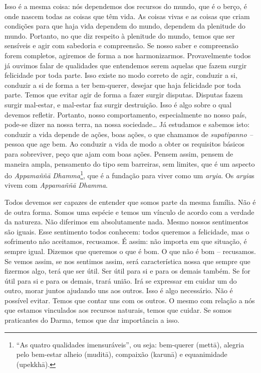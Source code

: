 Isso é a mesma coisa: nós dependemos dos recursos do mundo, que é o
berço, é onde nascem todas as coisas que têm vida. As coisas vivas e as
coisas que criam condições para que haja vida dependem do mundo,
dependem da plenitude do mundo. Portanto, no que diz respeito à
plenitude do mundo, temos que ser sensíveis e agir com sabedoria e
compreensão. Se nosso saber e compreensão forem completos, agiremos de
forma a nos harmonizarmos. Provavelmente todos já ouvimos falar de
qualidades que entendemos serem aquelas que fazem surgir felicidade por
toda parte. Isso existe no modo correto de agir, conduzir a si,
conduzir a si de forma a ter bem-querer, desejar que haja felicidade
por toda parte. Temos que evitar agir de forma a fazer surgir disputas.
Disputas fazem surgir mal-estar, e mal-estar faz surgir destruição.
Isso é algo sobre o qual devemos refletir. Portanto, nosso
comportamento, especialmente no nosso país, pode-se dizer na nossa
terra, na nossa sociedade… Já estudamos e sabemos isto: conduzir a vida
depende de ações, boas ações, o que chamamos de \textit{supatipanno –
}pessoa que age bem. Ao conduzir a vida de modo a obter os requisitos
básicos para sobreviver, peço que ajam com boas ações. Pensem assim,
pensem de maneira ampla, pensamento do tipo sem barreiras, sem limites,
que é um aspecto do \textit{Appamaññā} \textit{Dhamma}\footnote{“As
quatro qualidades imensuráveis”, ou seja: bem-querer (mettā), alegria
pelo bem-estar alheio (muditā), compaixão (karunā) e equanimidade
(upekkhā).}, que é a fundação para viver como um \textit{aryia}. Os
\textit{aryia}s vivem com \textit{Appamaññā} \textit{Dhamma}. 

Todos devemos ser capazes de entender que somos parte da mesma
família. Não é de outra forma. Somos uma espécie e temos um vínculo de
acordo com a verdade da natureza. Não diferimos em absolutamente nada.
Mesmo nossos sentimentos são iguais. Esse sentimento todos conhecem:
todos queremos a felicidade, mas o sofrimento não aceitamos, recusamos.
É assim: não importa em que situação, é sempre igual. Dizemos que
queremos o que é bom. O que não é bom – recusamos. Se vemos assim, se
nos sentimos assim, será característica nossa que sempre que fizermos
algo, terá que ser útil. Ser útil para si e para os demais também. Se
for útil para si e para os demais, trará união. Irá se expressar em
cuidar um do outro, morar juntos ajudando uns aos outros. Isso é algo
necessário. Não é possível evitar. Temos que contar uns com os outros.
O mesmo com relação a nós que estamos vinculados aos recursos naturais,
temos que cuidar. Se somos praticantes do Darma, temos que dar
importância a isso. 


